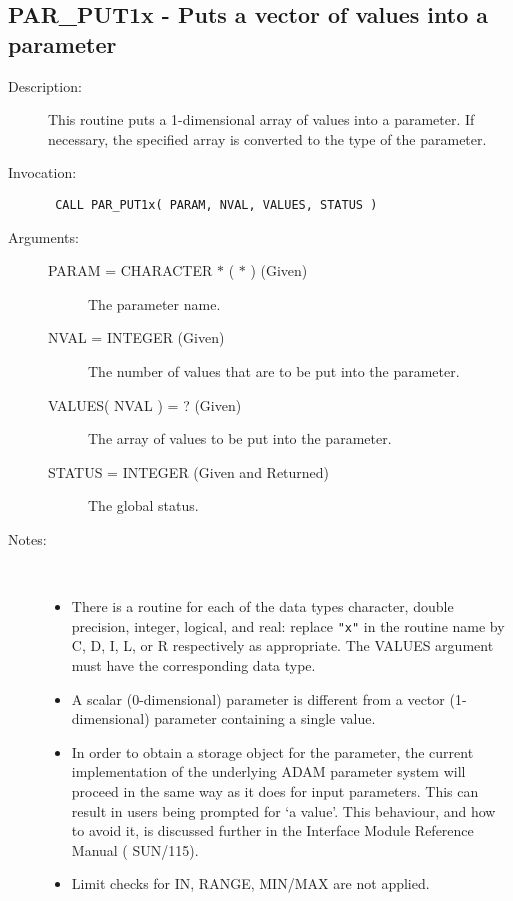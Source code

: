 \documentclass[twoside,11pt]{article}
\newcommand{\xref}[3]{#1}
\newcommand{\xlabel}[1]{}
\newlength{\sstbannerlength}
\newlength{\sstcaptionlength}
\newlength{\sstexampleslength}
\newlength{\sstexampleswidth}
\newcommand{\sstroutine}[3]{
   \goodbreak
   \rule{\textwidth}{0.5mm}
   \vspace{-7ex}
   \newline
   \settowidth{\sstbannerlength}{{\Large {\bf #1}}}
   \setlength{\sstcaptionlength}{\textwidth}
   \setlength{\sstexampleslength}{\textwidth}
   \addtolength{\sstbannerlength}{0.5em}
   \addtolength{\sstcaptionlength}{-2.0\sstbannerlength}
   \addtolength{\sstcaptionlength}{-5.0pt}
   \settowidth{\sstexampleswidth}{{\bf Examples:}}
   \addtolength{\sstexampleslength}{-\sstexampleswidth}
   \parbox[t]{\sstbannerlength}{\flushleft{\Large {\bf #1}}}
   \parbox[t]{\sstcaptionlength}{\center{\Large #2}}
   \parbox[t]{\sstbannerlength}{\flushright{\Large {\bf #1}}}
   \begin{description}
      #3
   \end{description}
}
\newcommand{\sstdescription}[1]{\item[Description:] #1}
\newcommand{\sstinvocation}[1]{\item[Invocation:]\hspace{0.4em}{\tt #1}}
\newcommand{\sstarguments}[1]{
   \item[Arguments:] \mbox{} \\
   \vspace{-3.5ex}
   \begin{description}
      #1
   \end{description}
}
\newcommand{\sstsubsection}[1]{ \item[{#1}] \mbox{} \\}
\newcommand{\sstnotes}[1]{\item[Notes:] \mbox{} \\[1.3ex] #1}
\newcommand{\sstitemlist}[1]{
  \mbox{} \\
  \vspace{-7ex}
  \begin{itemize}
     #1
  \end{itemize}
}
\newcommand{\sstitem}{\item}
\newcommand{\ssttt}{\tt}
\renewcommand{\sstroutine}[3]{
      \subsection{\xlabel{12}#1\xlabel{#1}-\label{#1}#2}
      \begin{description}
         #3
      \end{description}
   }
\renewcommand{\sstdescription}[1]{\item[Description:]
      \begin{description}
         #1
      \end{description}
   }
\renewcommand{\sstinvocation}[1]{\item[Invocation:]
      \begin{description}
         {\ssttt #1}
      \end{description}
   }
\renewcommand{\sstarguments}[1]{
      \item[Arguments:]
      \begin{description}
         #1
      \end{description}
   }
\renewcommand{\sstsubsection}[1]{\item[{#1}]}
\renewcommand{\sstnotes}[1]{\item[Notes:]
      \begin{description}
         #1
      \end{description}
   }
\newcommand{\sstitemlist}[1]{
      \begin{itemize}
         #1
      \end{itemize}
   }
\begin{document}
\sstroutine{
   PAR\_PUT1x
}{
   Puts a vector of values into a parameter
}{
   \sstdescription{
      This routine puts a 1-dimensional array of values into a
      parameter.  If necessary, the specified array is converted to
      the type of the parameter.
   }
   \sstinvocation{
      CALL PAR\_PUT1x( PARAM, NVAL, VALUES, STATUS )
   }
   \sstarguments{
      \sstsubsection{
         PARAM = CHARACTER $*$ ( $*$ ) (Given)
      }{
         The parameter name.
      }
      \sstsubsection{
         NVAL = INTEGER (Given)
      }{
         The number of values that are to be put into the parameter.
      }
      \sstsubsection{
         VALUES( NVAL ) = ? (Given)
      }{
         The array of values to be put into the parameter.
      }
      \sstsubsection{
         STATUS = INTEGER (Given and Returned)
      }{
         The global status.
      }
   }
   \sstnotes{
      \sstitemlist{

         \sstitem
         There is a routine for each of the data types character,
         double precision, integer, logical, and real: replace {\tt "x"} in the
         routine name by C, D, I, L, or R respectively as appropriate.  The
         VALUES argument must have the corresponding data type.

         \sstitem
         A scalar (0-dimensional) parameter is different from a vector
         (1-dimensional) parameter containing a single value.

         \sstitem
         In order to obtain a storage object for the parameter, the
         current implementation of the underlying ADAM parameter system
         will proceed in the same way as it does for input parameters.
         This can result in users being prompted for `a value'. This
         behaviour, and how to avoid it, is discussed further in the
         Interface Module Reference Manual (
         \xref{SUN/115}{sun115}{}).

         \sstitem
         Limit checks for IN, RANGE, MIN/MAX are not applied.
      }
   }
}
\end{document}

